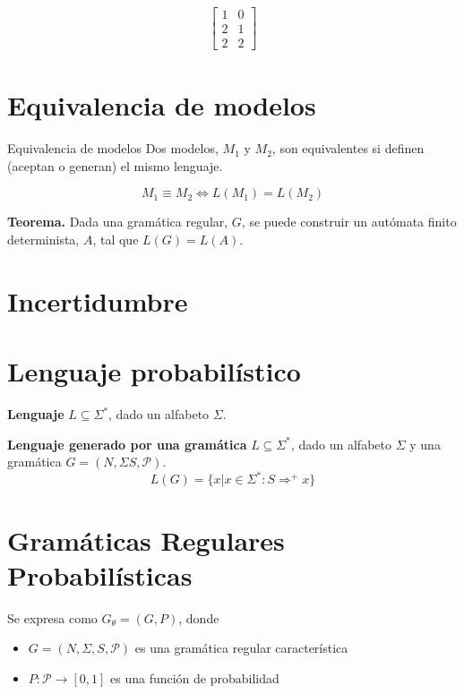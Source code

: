 \begin{align*}
    \left[
    \begin{array}{cc}
        1 & 0 \\
        2 & 1 \\
        2 & 2
    \end{array}
    \right]
\end{align*}

\section{Equivalencia de modelos}

\begin{definitionbox}{Equivalencia de modelos}
    Dos modelos, $M_1$ y $M_2$, son equivalentes si definen
    (aceptan o generan) el mismo lenguaje.

    $$ M_1 \equiv M_2 \iff L(M_1) = L(M_2) $$
\end{definitionbox}

\textbf{Teorema.} Dada una gramática regular, $G$, se puede construir un autómata
finito determinista, $A$, tal que $L(G) = L(A)$.

\section{Incertidumbre}

\section{Lenguaje probabilístico}

\textbf{Lenguaje}    $L \subseteq \Sigma^*$, dado un alfabeto $\Sigma$.

\textbf{Lenguaje generado por una gramática}    $L \subseteq \Sigma^*$, dado un
alfabeto $\Sigma$ y una gramática $G = (N,\Sigma S, \mathcal{P})$.
$$ L(G) = \{ x | x \in \Sigma^* : S \Rightarrow^+ x \} $$

\section{Gramáticas Regulares Probabilísticas}

Se expresa como $G_\theta = (G, P)$, donde

\begin{itemize}
    \item $G = (N, \Sigma, S, \mathcal{P})$ es una gramática regular característica
    \item $P : \mathcal{P} \to [0, 1]$ es una función de probabilidad
\end{itemize}

